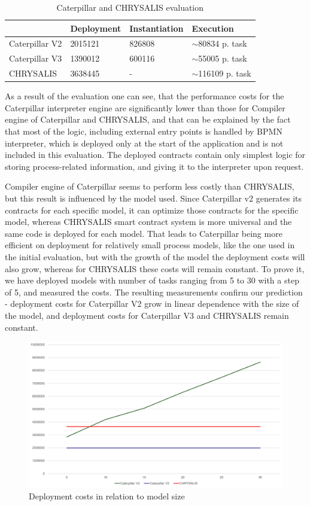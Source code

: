 \begin{table}[hbt]
	\begin{tabular}{|l|l|l|l|}
		\hline
		& Deployment & Instantiation & Execution            \\ \hline
		Caterpillar V2 & 2015121    & 826808        & $\sim$80834 p. task  \\ \hline
		Caterpillar V3 & 1390012    & 600116        & $\sim$55005 p. task  \\ \hline
		CHRYSALIS      & 3638445    & -             & $\sim$116109 p. task \\ \hline
	\end{tabular}
	\caption{Caterpillar and CHRYSALIS evaluation}
	\label{tab:caterpillar:eval:eval}
\end{table}
As a result of the evaluation one can see, that the performance costs for the Caterpillar interpreter engine are significantly lower than those for Compiler engine of Caterpillar and CHRYSALIS, and that can be explained by the fact that most of the logic, including external entry points is handled by BPMN interpreter, which is deployed only at the start of the application and is not included in this evaluation. The deployed contracts contain only simplest logic for storing process-related information, and giving it to the interpreter upon request.

Compiler engine of Caterpillar seems to perform less costly than CHRYSALIS, but this result is influenced by the model used. Since Caterpillar v2 generates its contracts for each specific model, it can optimize those contracts for the specific model, whereas CHRYSALIS smart contract system is more universal and the same code is deployed for each model. That leads to Caterpillar being more efficient on deployment for relatively small process models, like the one used in the initial evaluation, but with the growth of the model the deployment costs will also grow, whereas for CHRYSALIS these costs will remain constant. To prove it, we have deployed models with number of tasks ranging from 5 to 30 with a step of 5, and measured the costs. The resulting measurements confirm our prediction - deployment costs for Caterpillar V2 grow in linear dependence with the size of the model, and deployment costs for Caterpillar V3 and CHRYSALIS remain constant.

\begin{figure}[hbt]
	\includegraphics[width=\textwidth]{gfx/caterpillar-eval-graph}
	\caption{Deployment costs in relation to model size}
	\label{fig:caterpillar:eval:graph}
\end{figure}

